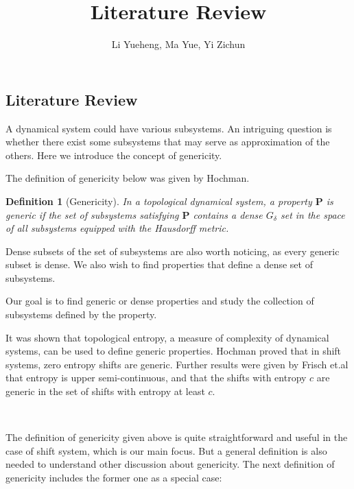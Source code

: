 \documentclass{article}
\newtheorem{definition}{Definition}
\begin{document}
\begin{CJK}{UTF8}{gbsn}

\title{Literature Review}
\author{Li Yueheng, Ma Yue, Yi Zichun}
\maketitle

\section{Literature Review}


A dynamical system could have various subsystems. An intriguing question is whether there exist some subsystems that may serve as approximation of the others. Here we introduce the concept of genericity.

The definition of genericity below was given by Hochman\cite{Hochman}.


\begin{definition}[Genericity]
	In a topological dynamical system, a property $\textbf{P}$ is generic if the set of subsystems satisfying $\textbf{P}$ contains a dense $G_\delta$ set in the space of all subsystems equipped with the Hausdorff metric.
\end{definition}

Dense subsets of the set of subsystems are also worth noticing, as every generic subset is dense. We also wish to find properties that define a dense set of subsystems.

Our goal is to find generic or dense properties and study the collection of subsystems defined by the property.

It was shown that topological entropy, a measure of complexity of dynamical systems, can be used to define generic properties. Hochman\cite{Hochman} proved that in shift systems, zero entropy shifts are generic. Further results were given by Frisch et.al\cite{Frisch} that entropy is upper semi-continuous, and that the shifts with entropy $c$ are generic in the set of shifts with entropy at least $c$.

\
\vspace{3ex}

The definition of genericity given above is quite straightforward and useful in the case of shift system, which is our main focus. But a general definition is also needed to understand other discussion about genericity. The next definition of genericity includes the former one as a special case:


\end{CJK}
\end{document}
